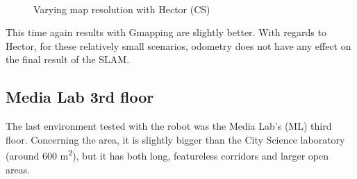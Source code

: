 \begin{figure}[t!]
  \centering
   \quad
   \\
  \caption{Varying map resolution with Hector (CS)}
  \label{fig:hectorcsmulti}
\end{figure}

This time again results with Gmapping are slightly better. With regards to Hector, for these relatively small scenarios, odometry does not have any effect on the final result of the SLAM.

\subsection{Media Lab 3rd floor}
The last environment tested with the robot was the Media Lab's (ML) third floor. Concerning the area, it is slightly bigger than the City Science laboratory (around 600 m\textsuperscript{2}), but it has both long, featureless corridors and larger open areas. 

